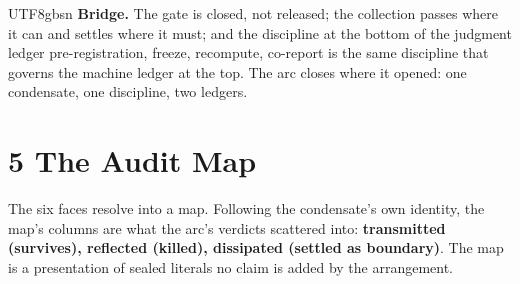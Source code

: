 \documentclass[11pt,letterpaper]{article}
\begin{document}
\begin{CJK}{UTF8}{gbsn}
\textbf{Bridge.} The gate is closed, not released; the collection passes where it can and settles where it must; and the discipline at the bottom of the judgment ledger \textemdash{} pre-registration, freeze, recompute, co-report \textemdash{} is the same discipline that governs the machine ledger at the top. The arc closes where it opened: one condensate, one discipline, two ledgers.

\section*{5 The Audit Map}

The six faces resolve into a map. Following the condensate's own identity, the map's columns are what the arc's verdicts scattered into: \textbf{transmitted (survives), reflected (killed), dissipated (settled as boundary)}. The map is a presentation of sealed literals \textemdash{} no claim is added by the arrangement.


\end{CJK}
\end{document}
